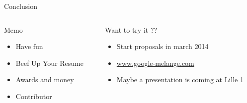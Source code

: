 \documentclass[11pt]{beamer}
\begin{document}
\begin{frame}{Conclusion}
	\begin{columns}[T]
    		\begin{column}{.45\textwidth}
    			\begin{block}{Memo}
    				\begin{itemize}
    					\item Have fun
    					\item Beef Up Your Resume
    					\item Awards and money
    					\item Contributor
    				\end{itemize}
    			\end{block}
    		\end{column}
    		\begin{column}{.5\textwidth}
   			\begin{block}{Want to try it ??}
   				\begin{itemize}
   					\item Start proposals in march 2014
   					\item \href{http://www.google-melange.com/}{www.google-melange.com}	
   					\item Maybe a presentation is coming at Lille 1
   				\end{itemize}   				
    			\end{block}
    		\end{column}
  \end{columns}
\end{frame}
\end{document}
